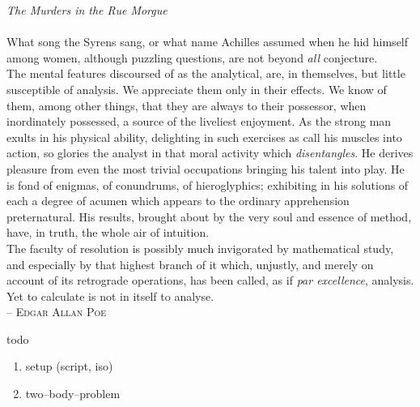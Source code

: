 \documentclass{article}
\begin{document}
\Huge
\textit{The Murders in the Rue Morgue}\\\\
What song the Syrens sang, or what name Achilles assumed when he hid himself among women, although puzzling questions, are not beyond \textit{all} conjecture.\\\indent
The mental features discoursed of as the analytical, are, in themselves, but little susceptible of analysis. 
We appreciate them only in their effects. 
We know of them, among other things, that they are always to their possessor, when inordinately possessed, a source of the liveliest enjoyment.
As the strong man exults in his physical ability, delighting in such exercises as call his muscles into action, so glories the analyst in that moral activity which \textit{disentangles}.
He derives pleasure from even the most trivial occupations bringing his talent into play.
He is fond of enigmas, of conundrums, of hieroglyphics; exhibiting in his solutions of each a degree of acumen which appears to the ordinary apprehension preternatural.
His results, brought about by the very soul and essence of method, have, in truth, the whole air of intuition.\\\indent
The faculty of resolution is possibly much invigorated by mathematical study, and especially by that highest branch of it which, unjustly, and merely on account of its retrograde operations, has been called, as if \textit{par excellence}, analysis. 
Yet to calculate is not in itself to analyse.\\
\null\hfill -- \textsc{Edgar Allan Poe}


\color{fg}

\vfill

\noindent todo
\begin{enumerate}[label=$\Box$]
        \item setup (script, iso)
        \item two--body--problem
\end{enumerate}
\end{document}
